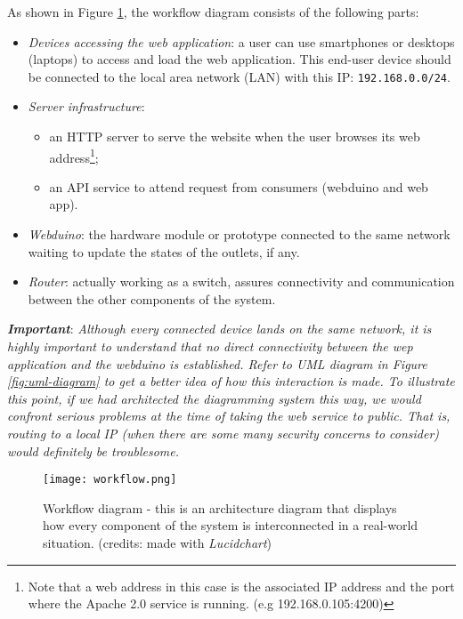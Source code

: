 As shown in Figure \ref{fig:workflow-diagram}, the workflow diagram consists of the following parts:
\begin{itemize}
    \item \textit{Devices accessing the web application}: a user can use smartphones or desktops (laptops) to access and load the web application. This end-user device should be connected to the local area network (LAN) with this IP: \texttt{192.168.0.0/24}.
    \item \textit{Server infrastructure}:
    \begin{itemize}
        \item an HTTP server to serve the website when the user browses its web address\footnote{Note that a web address in this case is the associated IP address and the port where the Apache 2.0 service is running. (e.g 192.168.0.105:4200)};
        \item an API service to attend request from consumers (webduino and web app).
    \end{itemize}
    \item \textit{Webduino}: the hardware module or prototype connected to the same network waiting to update the states of the outlets, if any.
    \item \textit{Router}: actually working as a switch, assures connectivity and communication between the other components of the system.
\end{itemize}

\textbf{\textit{Important}}: \textit{Although every connected device lands on the same network, it is highly important to understand that no direct connectivity between the wep application and the webduino is established. Refer to UML diagram in Figure \ref{fig:uml-diagram} to get a better idea of how this interaction is made. To illustrate this point, if we had architected the diagramming system this way, we would confront serious problems at the time of taking the web service to public. That is, routing to a local IP (when there are some many security concerns to consider) would definitely be troublesome.}

\begin{figure}[ht!]
    \centering
    \texttt{[image: workflow.png]}
    \caption{Workflow diagram - this is an architecture diagram that displays how every component of the system is interconnected in a real-world situation. (credits: made with \emph{Lucidchart})}
    \label{fig:workflow-diagram}
\end{figure}

